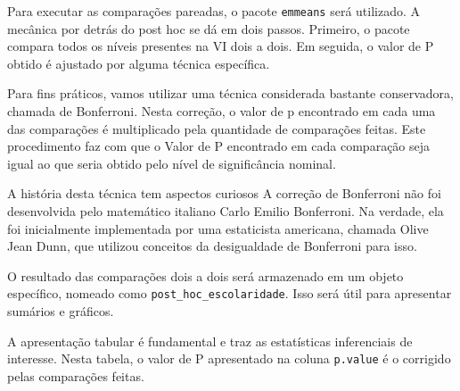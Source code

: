 \documentclass[
]{book}
\newenvironment{Shaded}{\begin{snugshade}}{\end{snugshade}}
\newcommand{\DataTypeTok}[1]{\textcolor[rgb]{0.13,0.29,0.53}{#1}}
\newcommand{\KeywordTok}[1]{\textcolor[rgb]{0.13,0.29,0.53}{\textbf{#1}}}
\newcommand{\NormalTok}[1]{#1}
\newcommand{\OperatorTok}[1]{\textcolor[rgb]{0.81,0.36,0.00}{\textbf{#1}}}
\newcommand{\OtherTok}[1]{\textcolor[rgb]{0.56,0.35,0.01}{#1}}
\newcommand{\StringTok}[1]{\textcolor[rgb]{0.31,0.60,0.02}{#1}}
\begin{document}
Para executar as comparações pareadas, o pacote \texttt{emmeans} será utilizado. A mecânica por detrás do post hoc se dá em dois passos. Primeiro, o pacote compara todos os níveis presentes na VI dois a dois. Em seguida, o valor de P obtido é ajustado por alguma técnica específica.

Para fins práticos, vamos utilizar uma técnica considerada bastante conservadora, chamada de Bonferroni. Nesta correção, o valor de p encontrado em cada uma das comparações é multiplicado pela quantidade de comparações feitas. Este procedimento faz com que o Valor de P encontrado em cada comparação seja igual ao que seria obtido pelo nível de significância nominal.

A história desta técnica tem aspectos curiosos A correção de Bonferroni não foi desenvolvida pelo matemático italiano Carlo Emilio Bonferroni. Na verdade, ela foi inicialmente implementada por uma estaticista americana, chamada Olive Jean Dunn, que utilizou conceitos da desigualdade de Bonferroni para isso.

O resultado das comparações dois a dois será armazenado em um objeto específico, nomeado como \texttt{post\_hoc\_escolaridade}. Isso será útil para apresentar sumários e gráficos.

\begin{Shaded}
\end{Shaded}

A apresentação tabular é fundamental e traz as estatísticas inferenciais de interesse. Nesta tabela, o valor de P apresentado na coluna \texttt{p.value} é o corrigido pelas comparações feitas.

\begin{Shaded}
\end{Shaded}
\end{document}
